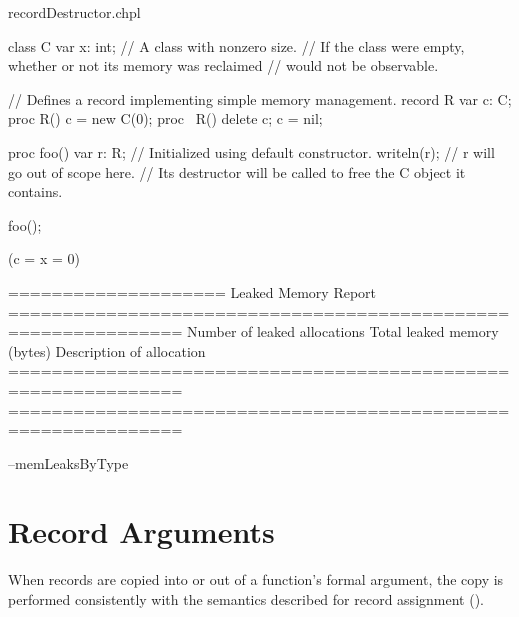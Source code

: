 \begin{chapelexample}{recordDestructor.chpl}
\begin{chapel}
class C { var x: int; } // A class with nonzero size.
// If the class were empty, whether or not its memory was reclaimed 
// would not be observable.

// Defines a record implementing simple memory management.
record R {
  var c: C;
  proc R() { c = new C(0); }
  proc ~R() { delete c; c = nil; }
}

proc foo()
{
  var r: R; // Initialized using default constructor.
  writeln(r);
  // r will go out of scope here.
  // Its destructor will be called to free the C object it contains.
}

foo();
\end{chapel}
\begin{chapeloutput}
(c = {x = 0})

====================
Leaked Memory Report
==============================================================
Number of leaked allocations
           Total leaked memory (bytes)
                      Description of allocation
==============================================================
==============================================================
\end{chapeloutput}
\begin{chapelexecopts}
--memLeaksByType
\end{chapelexecopts}
\end{chapelexample}


\section{Record Arguments}
\label{Record_Arguments}

When records are copied into or out of a function's formal argument,
the copy is performed consistently with the semantics described for
record assignment ().

